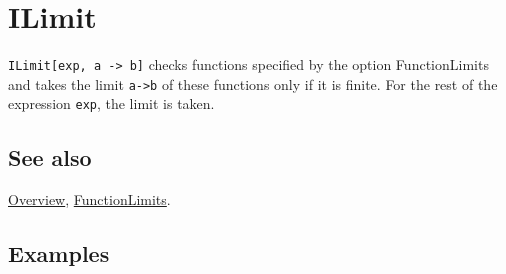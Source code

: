 \documentclass[../FeynCalcManual.tex]{subfiles}
\begin{document}
\hypertarget{ilimit}{
\section{ILimit}\label{ilimit}}

\texttt{ILimit[\allowbreak{}exp,\ \allowbreak{}a -> b]} checks functions
specified by the option FunctionLimits and takes the limit \texttt{a->b}
of these functions only if it is finite. For the rest of the expression
\texttt{exp}, the limit is taken.

\subsection{See also}

\hyperlink{toc}{Overview}, \hyperlink{functionlimits}{FunctionLimits}.

\subsection{Examples}
\end{document}
